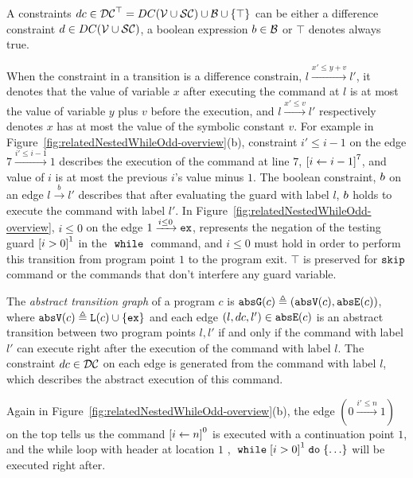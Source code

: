 \begin{defn}[Constraints]
A constraints $dc \in \mathcal{DC}^{\top} = DC(\mathcal{V}  \cup \mathcal{SC}) \cup \mathcal{B}\cup \{\top\}$  can be either a
difference constraint $d \in DC(\mathcal{V}  \cup \mathcal{SC})$, a boolean expression $b \in \mathcal{B}$
or $\top$ denotes always true.
\end{defn}

When the constraint in a transition is a difference constrain, $l \xrightarrow{x' \leq y + v} l'$,
it denotes that
the value of variable $x$
after executing the command at $l$ is at most
the value of variable $y$ plus $v$ before the execution,
and $l \xrightarrow{x' \leq v} l'$ respectively denotes
$x$ has at most
the value of the symbolic constant $v$.
For example in Figure~\ref{fig:relatedNestedWhileOdd-overview}(b), constraint $i' \leq i - 1$ on the edge $7 \xrightarrow{i' \leq i - 1} 1$
describes the execution of
 the command at line $7$, 
$\clabel{\assign{i}{i - 1}}^{7}$, and value of $i$ is at most the previous $i$'s value minus $1$.
%
%
The boolean constraint, $b$ on an edge $l \xrightarrow{b} l'$ describes
that after evaluating the guard with label $l$,
$b$ holds to execute the command with label $l'$.
In Figure~\ref{fig:relatedNestedWhileOdd-overview}, $i \leq 0 $ on the edge $1 \xrightarrow{i \leq 0} \mathtt{ex}$, 
represents the negation of the testing guard $\clabel{i > 0}^1$
in the $\;\mathtt{while}\;$ command, and $i \leq 0$ must hold in order to perform this transition from program point $1$ to
the program exit. 
$\top$ is preserved for $\mathtt{skip}$ command or the commands that don't interfere any guard variable.

\begin{defn}
  \label{def:abs_cfg}
  The \emph{abstract transition graph} of a program $c$ is $\mathtt{abs}{\mathtt{G}}(c) \triangleq (\mathtt{abs}{\mathtt{V}}(c), \mathtt{abs}{\mathtt{E}}(c))$, where
  $\mathtt{abs}{\mathtt{V}}(c) \triangleq \mathtt{L}(c)\cup\{\mathtt{ex}\}$
  and 
  each edge $(l, dc, l') \in \mathtt{abs}{\mathtt{E}}(c)$ is an abstract transition
between two program points $l, l'$ if and only if
the command with label $l'$ can execute right after the execution of the command with label $l$.
The constraint $dc \in \mathcal{DC}$ on each edge is generated from the command with label $l$, which describes the abstract execution of this command.
\end{defn}
Again in Figure~\ref{fig:relatedNestedWhileOdd-overview}(b),
the edge $(0 \xrightarrow{i' \leq n} 1)$ on the top tells us the command 
$\clabel{\assign{i}{n}}^0$ is executed with a continuation point $1$, and the while loop with header at location $1$ , $\ewhile \clabel{i > 0}^1 \edo \{\ldots\}$ will be executed right after.

